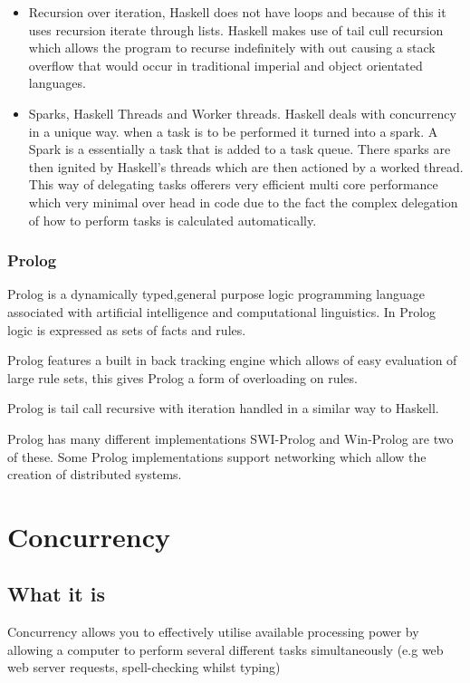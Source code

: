 \documentclass[a4paper,oneside]{report}
\begin{document}
	\begin{itemize}
	\item Recursion over iteration, Haskell does not have loops and because of this it uses recursion iterate through lists. Haskell makes use of tail cull recursion which allows the program to recurse indefinitely with out causing a stack overflow that would occur in traditional imperial and object orientated languages.
	
	\item Sparks, Haskell Threads and Worker threads. Haskell deals with concurrency in a unique way. when a task is to be performed it turned into a spark. A Spark is a essentially a task that is added to a task queue.  There sparks are then ignited by Haskell's threads which are then actioned by a worked thread. This way of delegating tasks offerers very efficient multi core performance which very minimal over head in code due to the fact the complex delegation of how to perform tasks is calculated automatically.

	\end{itemize}
	


	\subsection{Prolog}
	Prolog is a dynamically typed,general purpose logic programming language associated with artificial intelligence and computational linguistics. In Prolog logic is expressed as sets of facts and rules.
	
	Prolog features a built in back tracking engine which allows of easy evaluation of large rule sets, this gives Prolog a form of overloading on rules. 
	
	Prolog is tail call recursive with iteration handled in a similar way to Haskell.
	
	Prolog has many different implementations SWI-Prolog and Win-Prolog are two of these. Some Prolog implementations support networking which allow the creation of distributed systems. 


\chapter{Concurrency}
	\section{What it is}
	
	Concurrency allows you to effectively utilise available processing power by allowing a computer to perform several different tasks simultaneously (e.g web web server requests, spell-checking whilst typing)
	
\end{document}
